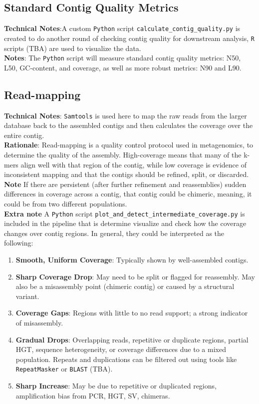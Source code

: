 \documentclass[11pt]{report}
\begin{document}
\subsection{Standard Contig Quality Metrics}
\textbf{Technical Notes}:A custom \texttt{Python} script \texttt{calculate\_contig\_quality.py} is created to do another round of checking contig quality for downstream analysis, \texttt{R} scripts (TBA) are used to visualize the data. \\
\textbf{Notes}: The \texttt{Python} script will measure standard contig quality metrics: N50, L50, GC-content, and coverage, as well as more robust metrics: N90 and L90.


\subsection{Read-mapping}
\textbf{Technical Notes}: \texttt{Samtools} is used here to map the raw reads from the larger database back to the assembled contigs and then calculates the coverage over the entire contig. \\
\textbf{Rationale}: Read-mapping is a quality control protocol used in metagenomics, to determine the quality of the assembly. High-coverage means that many of the k-mers align well with that region of the contig, while low coverage is evidence of inconsistent mapping and that the contigs should be refined, split, or discarded.\\
\textbf{Note} If there are persistent (after further refinement and reassemblies) sudden differences in coverage across a contig, that contig could be chimeric, meaning, it could be from two different populations. 
\\ \textbf{Extra note} A \texttt{Python} script \texttt{plot\_and\_detect\_intermediate\_coverage.py} is included in the pipeline that is determine visualize and check how the coverage changes over contig regions. In general, they could be interpreted as the following:
\begin{enumerate}
	\item \textbf{Smooth, Uniform Coverage}: Typically shown by well-assembled contigs.
	\item \textbf{Sharp Coverage Drop}: May need to be split or flagged for reassembly. May also be a misassembly point (chimeric contig) or caused by a structural variant.
	\item \textbf{Coverage Gaps}: Regions with little to no read support; a strong indicator of misassembly.
	\item \textbf{Gradual Drops}: Overlapping reads, repetitive or duplicate regions, partial HGT, sequence heterogeneity, or coverage differences due to a mixed population. Repeats and duplications can be filtered out using tools like \texttt{RepeatMasker} or \texttt{BLAST} (TBA).
	\item \textbf{Sharp Increase}: May be due to repetitive or duplicated regions, amplification bias from PCR, HGT, SV, chimeras.
\end{enumerate}
\end{document}
